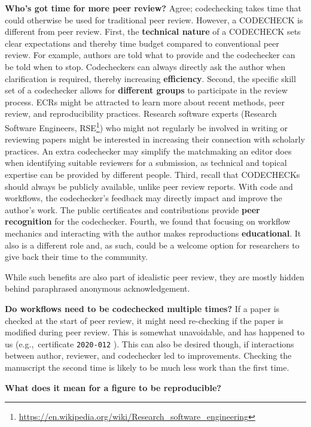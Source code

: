 \documentclass[12pt]{article}
\begin{document}
\textbf{Who's got time for more peer review?} Agree; codechecking
takes time that could otherwise be used for traditional peer review.
However, a CODECHECK is different from peer review.  First, the
\textbf{technical nature} of a CODECHECK sets clear expectations and
thereby time budget compared to conventional peer review.  For
example, authors are told what to provide and the codechecker can be
told when to stop.  Codecheckers can always directly ask the author
when clarification is required, thereby increasing
\textbf{efficiency}.  Second, the specific skill set of a codechecker
allows for \textbf{different groups} to participate in the review
process.  ECRs might be attracted to learn more about recent methods,
peer review, and reproducibility practices.  Research software experts
(Research Software Engineers,
RSE\footnote{\url{https://en.wikipedia.org/wiki/Research_software_engineering}})
who might not regularly be involved in writing or reviewing papers
might be interested in increasing their connection with scholarly
practices.  An extra codechecker may simplify the matchmaking an
editor does when identifying suitable reviewers for a submission,
as technical and topical expertise can be provided by different
people.  Third, recall that CODECHECKs should always be publicly
available, unlike peer review reports.  With code and workflows, the
codechecker's feedback may directly impact and improve the author's
work.  The public certificates and contributions provide \textbf{peer
  recognition} for the codechecker.  Fourth, we found that focusing on
workflow mechanics and interacting with the author makes reproductions
\textbf{educational}. It also is a different role and, as such, could
be a welcome option for researchers to give back their time to the
community.

While such benefits are also part of idealistic peer review, they are
mostly hidden behind paraphrased anonymous acknowledgement.

\textbf{Do workflows need to be codechecked multiple times?}  If a
paper is checked at the start of peer review, it might need
re-checking if the paper is modified during peer review.  This is
somewhat unavoidable, and has happened to us (e.g.,~certificate
\texttt{2020-012} \cite{cert-2020-012}). This can
also be desired though, if interactions between author, reviewer,
and codechecker led to improvements.  Checking the manuscript the
second time is likely to be much less work than the first time.



\textbf{What does it mean for a figure to be reproducible?}
\end{document}
